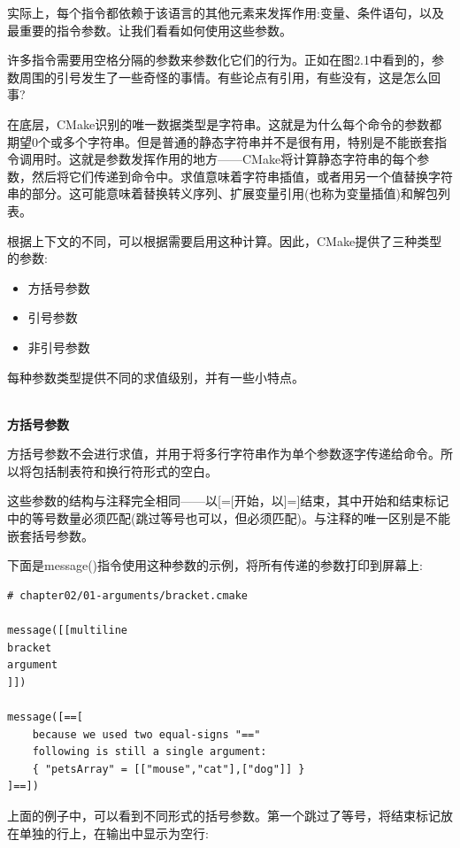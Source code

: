 实际上，每个指令都依赖于该语言的其他元素来发挥作用:变量、条件语句，以及最重要的指令参数。让我们看看如何使用这些参数。


许多指令需要用空格分隔的参数来参数化它们的行为。正如在图2.1中看到的，参数周围的引号发生了一些奇怪的事情。有些论点有引用，有些没有，这是怎么回事?

在底层，CMake识别的唯一数据类型是字符串。这就是为什么每个命令的参数都期望0个或多个字符串。但是普通的静态字符串并不是很有用，特别是不能嵌套指令调用时。这就是参数发挥作用的地方——CMake将计算静态字符串的每个参数，然后将它们传递到命令中。求值意味着字符串插值，或者用另一个值替换字符串的部分。这可能意味着替换转义序列、扩展变量引用(也称为变量插值)和解包列表。

根据上下文的不同，可以根据需要启用这种计算。因此，CMake提供了三种类型的参数:

\begin{itemize}
\item 
方括号参数

\item 
引号参数

\item 
非引号参数
\end{itemize}

每种参数类型提供不同的求值级别，并有一些小特点。

\hspace*{\fill} \\ %
\noindent
\textbf{方括号参数}

方括号参数不会进行求值，并用于将多行字符串作为单个参数逐字传递给命令。所以将包括制表符和换行符形式的空白。

这些参数的结构与注释完全相同——以[=[开始，以]=]结束，其中开始和结束标记中的等号数量必须匹配(跳过等号也可以，但必须匹配)。与注释的唯一区别是不能嵌套括号参数。

下面是message()指令使用这种参数的示例，将所有传递的参数打印到屏幕上:

\begin{lstlisting}[style=styleCMake]
# chapter02/01-arguments/bracket.cmake	

message([[multiline
bracket
argument
]])

message([==[
	because we used two equal-signs "=="
	following is still a single argument:
	{ "petsArray" = [["mouse","cat"],["dog"]] }
]==])
\end{lstlisting}

上面的例子中，可以看到不同形式的括号参数。第一个跳过了等号，将结束标记放在单独的行上，在输出中显示为空行:

